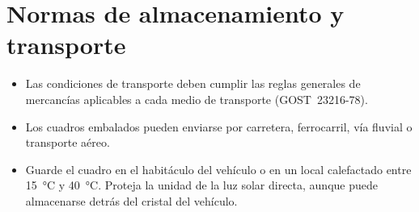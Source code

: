 \chapter{Normas de almacenamiento y transporte}\label{ch:storage}

\begin{itemize}
    \item Las condiciones de transporte deben cumplir las reglas generales de mercancías aplicables a cada medio de transporte (GOST~23216-78).
    \item Los cuadros embalados pueden enviarse por carretera, ferrocarril, vía fluvial o transporte aéreo.
    \item Guarde el cuadro en el habitáculo del vehículo o en un local calefactado entre \SI{15}{\celsius} y \SI{40}{\celsius}. Proteja la unidad de la luz solar directa, aunque puede almacenarse detrás del cristal del vehículo.
\end{itemize}
